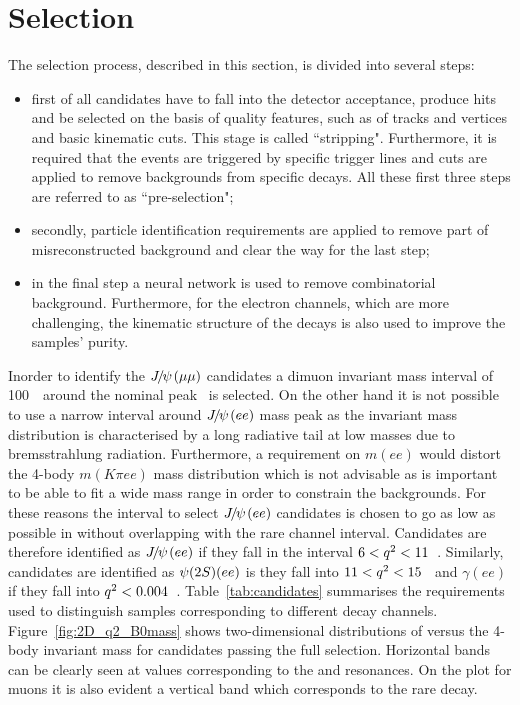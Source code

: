 
\section{Selection}
\label{sec:RKst_selection}

The selection process, described in this section, is divided into several steps:
\begin{itemize}
\item first of all candidates have to fall into the detector acceptance, produce hits and be selected
on the basis of quality features, such as \chisq of tracks and vertices and basic kinematic cuts.
This stage is called ``stripping". Furthermore, it is required that the events are triggered by specific
trigger lines and cuts are applied to remove backgrounds from specific decays.
All these first three steps are referred to as ``pre-selection";
\item secondly, particle identification requirements are applied to remove part of misreconstructed
background and clear the way for the last step;
\item in the final step a neural network is used to remove combinatorial background. Furthermore,
for the electron channels, which are more challenging, the kinematic structure of the decays
is also used to improve the samples' purity.
\end{itemize}
%
Inorder to identify the $\jpsi(\mu\mu)$ candidates a dimuon invariant mass
interval of 100~\mevcc~around the nominal \jpsi peak~\cite{PDG2014} is selected.
On the other hand it is not possible to use a narrow interval around $\jpsi(ee)$ mass peak as the invariant mass
distribution is characterised by a long radiative tail at low masses due to bremsstrahlung radiation.
Furthermore, a requirement on $m(ee)$ would distort the 4-body $m(K\pi ee)$ mass distribution which is not advisable as is
important to be able to fit a wide mass range in order to constrain the backgrounds. For these reasons the interval to select
$\jpsi(ee)$ candidates is chosen to go as low as possible in \qsq without overlapping with
the rare channel interval. Candidates are therefore identified as $\jpsi(ee)$ if they fall in the \qsq interval
$6 < {q^2} < 11$~\gevgevcccc. Similarly, candidates are identified as $\psitwos(ee)$ is they fall into $11 < {q^2} < 15$~\gevgevcccc
and $\gamma(ee)$ if they fall into ${q^2} < 0.004$~\gevgevcccc.
Table~\ref{tab:candidates} summarises the requirements used to distinguish samples corresponding to different decay channels.
Figure~\ref{fig:2D_q2_B0mass} shows two-dimensional distributions of \qsq versus the 4-body invariant mass 
for candidates passing the full selection. Horizontal bands can be clearly seen at \qsq values corresponding to the \jpsi and \psitwos resonances.
On the plot for muons it is also evident a vertical band which corresponds to the rare decay.

